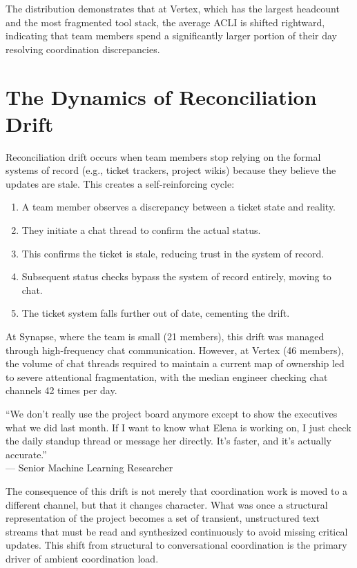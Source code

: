 The distribution demonstrates that at Vertex, which has the largest headcount and the most fragmented tool stack, the average ACLI is shifted rightward, indicating that team members spend a significantly larger portion of their day resolving coordination discrepancies.

\section{The Dynamics of Reconciliation Drift}

Reconciliation drift occurs when team members stop relying on the formal systems of record (e.g., ticket trackers, project wikis) because they believe the updates are stale. This creates a self-reinforcing cycle:

\begin{enumerate}
  \item A team member observes a discrepancy between a ticket state and reality.
  \item They initiate a chat thread to confirm the actual status.
  \item This confirms the ticket is stale, reducing trust in the system of record.
  \item Subsequent status checks bypass the system of record entirely, moving to chat.
  \item The ticket system falls further out of date, cementing the drift.
\end{enumerate}

At Synapse, where the team is small (21 members), this drift was managed through high-frequency chat communication. However, at Vertex (46 members), the volume of chat threads required to maintain a current map of ownership led to severe attentional fragmentation, with the median engineer checking chat channels 42 times per day.

\begin{fieldexcerpt}[title={Field note, Synapse, week 12}]
``We don't really use the project board anymore except to show the executives what we did last month. If I want to know what Elena is working on, I just check the daily standup thread or message her directly. It's faster, and it's actually accurate.''\\[2pt]
\hfill--- Senior Machine Learning Researcher
\end{fieldexcerpt}

The consequence of this drift is not merely that coordination work is moved to a different channel, but that it changes character. What was once a structural representation of the project becomes a set of transient, unstructured text streams that must be read and synthesized continuously to avoid missing critical updates. This shift from structural to conversational coordination is the primary driver of ambient coordination load.
